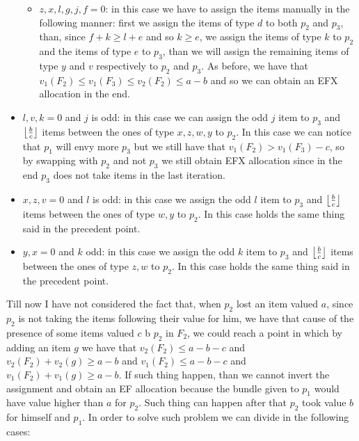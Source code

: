 \begin{itemize}
\begin{itemize}
        \item $z,x,l,g,j,f=0$: in this case we have to assign the items manually in the following manner: first we assign the items of type $d$ to both $p_2$ and $p_3$, than, since $f+k\ge l+e$ and so $k\ge e$, we assign the items of type $k$ to $p_2$ and the items of type $e$ to $p_3$, than we will assign the remaining items of type $y$ and $v$ respectively to $p_2$ and $p_3$. As before, we have that $v_1(F_2)\le v_1(F_3) \le v_2(F_2)\le a-b$ and so we can obtain an EFX allocation in the end.
    \end{itemize}
    \item $l,v,k=0$ and $j$ is odd: in this case we can assign the odd $j$ item to $p_3$ and $\left \lfloor\frac{b}{c}\right \rfloor$ items between the ones of type $x,z,w,y$ to $p_2$. In this case we can notice that $p_1$ will envy more $p_3$ but we still have that $v_1(F_2) > v_1(F_3) - c$, so by swapping with $p_2$ and not $p_3$ we still obtain EFX allocation since in the end $p_3$ does not take items in the last iteration.
    \item $x,z,v=0$ and $l$ is odd: in this case we assign the odd $l$ item to $p_3$ and $\left \lfloor\frac{b}{c}\right \rfloor$ items between the ones of type $w,y$ to $p_2$. In this case holds the same thing said in the precedent point.
    \item $y,x=0$ and $k$ odd: in this case we assign the odd $k$ item to $p_3$ and $\left \lfloor\frac{b}{c}\right \rfloor$ items between the ones of type $z,w$ to $p_2$. In this case holds the same thing said in the precedent point.
\end{itemize}
Till now I have not considered the fact that, when $p_2$ lost an item valued $a$, since $p_2$ is not taking the items following their value for him, we have that cause of the presence of some items valued $c$ b $p_2$ in $F_2$, we could reach a point in which by adding an item $g$ we have that $v_2(F_2) \le a-b-c$ and $v_2(F_2) +v_2(g)\ge a-b$ and $v_1(F_2) \le a-b-c$ and $v_1(F_2) +v_1(g)\ge a-b$. If such thing happen, than we cannot invert the assignment and obtain an EF allocation because the bundle given to $p_1$ would have value higher than $a$ for $p_2$. Such thing can happen after that $p_2$ took value $b$ for himself and $p_1$. In order to solve such problem we can divide in the following cases:
